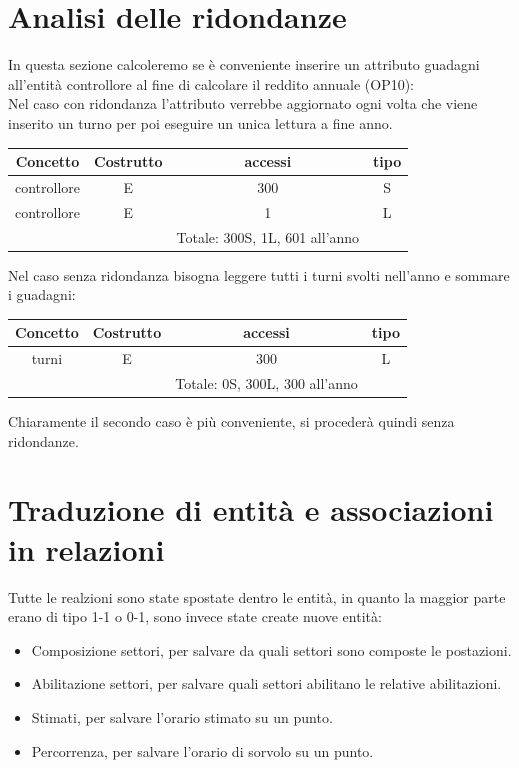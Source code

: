\section{Analisi delle ridondanze}
In questa sezione calcoleremo se è conveniente inserire un attributo guadagni all'entità controllore al fine di calcolare il reddito annuale (OP10):\\
Nel caso con ridondanza l'attributo verrebbe aggiornato ogni volta che viene inserito un turno per poi eseguire un unica lettura a fine anno.
\begin{table}[H]
     \centering
     \begin{tabular}{|c|c|c|c|}
     \hline
     \rowcolor{green!70!black!80}
     \textbf{Concetto} & \textbf{Costrutto} & \textbf{accessi} & \textbf{tipo}\\
     \hline
     controllore & E & 300 & S \\
     controllore & E & 1 & L \\
     & & Totale: 300S, 1L, 601 all'anno &\\
     \hline
     \end{tabular}
     \end{table}
Nel caso senza ridondanza bisogna leggere tutti i turni svolti nell'anno e sommare i guadagni:
\begin{table}[H]
     \centering
     \begin{tabular}{|c|c|c|c|}
     \hline
     \rowcolor{green!70!black!80}
     \textbf{Concetto} & \textbf{Costrutto} & \textbf{accessi} & \textbf{tipo}\\
     \hline
     turni & E & 300 & L \\
     & & Totale: 0S, 300L, 300 all'anno &\\
     \hline
     \end{tabular}
     \end{table}

Chiaramente il secondo caso è più conveniente, si procederà quindi senza ridondanze.


\section{Traduzione di entità e associazioni in relazioni}
Tutte le realzioni sono state spostate dentro le entità, in quanto la maggior parte erano di tipo 1-1 o 0-1,
sono invece state create nuove entità:
\begin{itemize}
  \item Composizione settori, per salvare da quali settori sono composte le postazioni.
  \item Abilitazione settori, per salvare quali settori abilitano le relative abilitazioni.
  \item Stimati, per salvare l'orario stimato su un punto.
  \item Percorrenza, per salvare l'orario di sorvolo su un punto.
\end{itemize}


